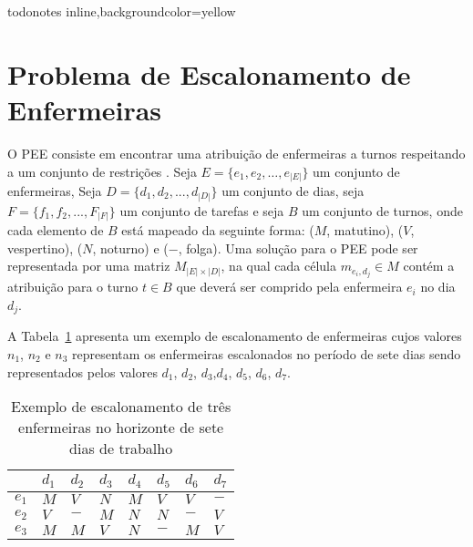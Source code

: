{ }

\presetkeys%
    {todonotes}%
    {inline,backgroundcolor=yellow}{}


\section{Problema de Escalonamento de Enfermeiras}


O \ac{PEE} consiste em encontrar uma atribuição de enfermeiras a turnos respeitando a um conjunto de restrições \cite{ioanis:2015}. Seja $E = \{e_1, e_2, \ldots, e_{|E|}\}$ um conjunto de enfermeiras, Seja $D = \{d_1, d_2, ..., d_{|D|}\}$ um conjunto de dias, seja $F = \{ f_1, f_2, ..., F_{|F|} \}$ um conjunto de tarefas e seja $B$ um conjunto de turnos, onde cada elemento de $B$ está mapeado da seguinte forma: ($M$, matutino), ($V$, vespertino), ($N$, noturno) e ($-$, folga). Uma solução para o \ac{PEE} pode ser representada por uma matriz $M_{|E|\times |D|}$, na qual cada célula $m_{e_i,d_j} \in M$ contém a atribuição para o turno $t\in B $ que deverá ser comprido pela enfermeira $e_i$ no dia $d_j$.


A Tabela~\ref{enfermeira_dia} apresenta um exemplo de escalonamento de enfermeiras cujos valores $n_1$, $n_2$ e $n_3$ representam os enfermeiras escalonados no período de sete dias sendo representados pelos valores $d_1$, $d_2$, $d_3$,$d_4$, $d_5$, $d_6$, $d_7$.

\begin{table}[ht]
 \centering
\caption{Exemplo de escalonamento de três enfermeiras no horizonte de sete dias de trabalho \label{enfermeira_dia}}
\begin{tabular}{r|l|l|l|l|l|l|l}
  	   & $d_1$ & $d_2$ & $d_3$ & $d_4$ & $d_5$ & $d_6$ & $d_7$ \\ \hline
 $e_1$ & $M$  & $V$  & $N$  & $M$  & $V$  & $V$  & $-$ \\ \hline
 $e_2$ & $V$  & $-$  & $M$  & $N$  & $N$  & $-$  & $V$\\ \hline
 $e_3$ & $M$  & $M$  & $V$  & $N$  & $-$  & $M$  & $V$
\end{tabular}
\end{table}

